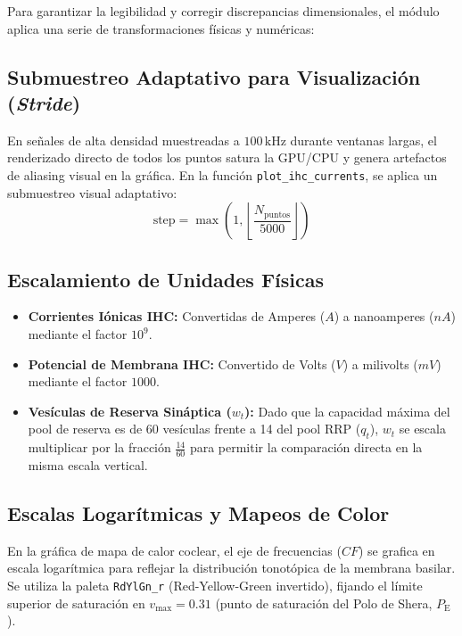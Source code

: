 \documentclass[12pt,a4paper]{article}
\begin{document}
Para garantizar la legibilidad y corregir discrepancias dimensionales, el módulo aplica una serie de transformaciones físicas y numéricas:

\subsection{Submuestreo Adaptativo para Visualización (\emph{Stride})}
En señales de alta densidad muestreadas a $100\,\text{kHz}$ durante ventanas largas, el renderizado directo de todos los puntos satura la GPU/CPU y genera artefactos de aliasing visual en la gráfica. En la función \texttt{plot\_ihc\_currents}, se aplica un submuestreo visual adaptativo:
\begin{equation}
\text{step} = \max\left(1, \left\lfloor \frac{N_{\text{puntos}}}{5000} \right\rfloor \right)
\end{equation}

\subsection{Escalamiento de Unidades Físicas}
\begin{itemize}
    \item \textbf{Corrientes Iónicas IHC:} Convertidas de Amperes ($A$) a nanoamperes ($nA$) mediante el factor $10^9$.
    \item \textbf{Potencial de Membrana IHC:} Convertido de Volts ($V$) a milivolts ($mV$) mediante el factor $1000$.
    \item \textbf{Vesículas de Reserva Sináptica ($w_t$):} Dado que la capacidad máxima del pool de reserva es de 60 vesículas frente a 14 del pool RRP ($q_t$), $w_t$ se escala multiplicar por la fracción $\frac{14}{60}$ para permitir la comparación directa en la misma escala vertical.
\end{itemize}

\subsection{Escalas Logarítmicas y Mapeos de Color}
En la gráfica de mapa de calor coclear, el eje de frecuencias ($CF$) se grafica en escala logarítmica para reflejar la distribución tonotópica de la membrana basilar. Se utiliza la paleta \texttt{RdYlGn\_r} (Red-Yellow-Green invertido), fijando el límite superior de saturación en $v_{\max} = 0.31$ (punto de saturación del Polo de Shera, $P_{\mathrm{E}}$).

\end{document}
